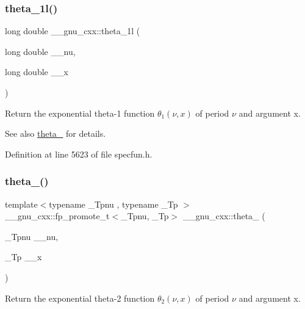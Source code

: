 \subsubsection{\texorpdfstring{theta\+\_\+1l()}{theta\_1l()}}
{\footnotesize\ttfamily long double \+\_\+\+\_\+gnu\+\_\+cxx\+::theta\+\_\+1l (\begin{DoxyParamCaption}\item[{long double}]{\+\_\+\+\_\+nu,  }\item[{long double}]{\+\_\+\+\_\+x }\end{DoxyParamCaption})\hspace{0.3cm}{\ttfamily [inline]}}

Return the exponential theta-\/1 function $ \theta_1(\nu,x) $ of period $ \nu $ and argument {\ttfamily x}.

\begin{DoxySeeAlso}{See also}
\hyperlink{group__mathsf__gnu_gaa2e5a3a5f550fe032a596a8b01c878c0}{theta\+\_} for details. 
\end{DoxySeeAlso}


Definition at line 5623 of file specfun.\+h.

\mbox{\label{group__mathsf__gnu_ga16f278edeb2842d614bae1f1ae2d0256}} 
\subsubsection{\texorpdfstring{theta\+\_()}{theta\_2()}}
{\footnotesize\ttfamily template$<$typename \+\_\+\+Tpnu , typename \+\_\+\+Tp $>$ \\
\+\_\+\+\_\+gnu\+\_\+cxx\+::fp\+\_\+promote\+\_\+t$<$\+\_\+\+Tpnu, \+\_\+\+Tp$>$ \+\_\+\+\_\+gnu\+\_\+cxx\+::theta\+\_ (\begin{DoxyParamCaption}\item[{\+\_\+\+Tpnu}]{\+\_\+\+\_\+nu,  }\item[{\+\_\+\+Tp}]{\+\_\+\+\_\+x }\end{DoxyParamCaption})\hspace{0.3cm}{\ttfamily [inline]}}

Return the exponential theta-\/2 function $ \theta_2(\nu,x) $ of period $ \nu $ and argument {\ttfamily x}.

